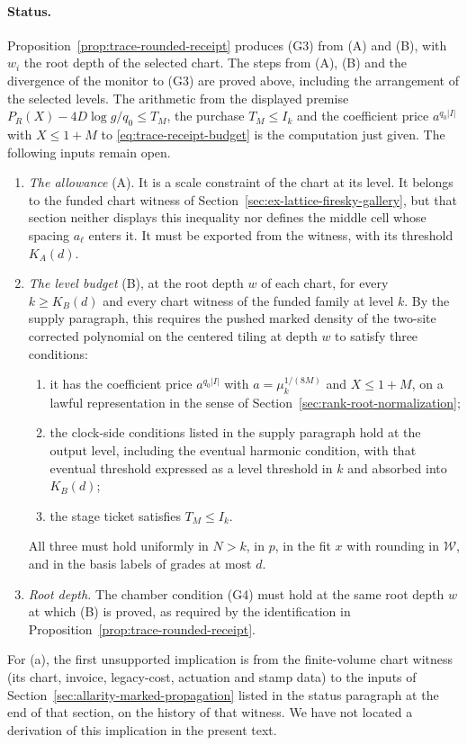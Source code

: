 \paragraph{Status.}
Proposition~\ref{prop:trace-rounded-receipt} produces (G3) from (A) and
(B), with $w_i$ the root depth of the selected chart. The steps from
(A), (B) and the divergence of the monitor to (G3) are proved above,
including the arrangement of the selected levels. The arithmetic from the
displayed premise $P_R(X)-4D\log g/q_0\le T_M$, the purchase
$T_M\le I_k$ and the coefficient price $a^{q_0|I|}$ with $X\le1+M$ to
\eqref{eq:trace-receipt-budget} is the computation just given. The
following inputs remain open.
\begin{enumerate}
\item \emph{The allowance} (A). It is a scale constraint of the chart at
 its level. It belongs to the funded chart witness of
 Section~\ref{sec:ex-lattice-firesky-gallery}, but that section neither
 displays this inequality nor defines the middle cell whose spacing
 $a_\ell$ enters it. It must be exported from the witness, with its
 threshold $K_A(d)$.
\item \emph{The level budget} (B), at the root depth $w$ of each chart,
 for every $k\ge K_B(d)$ and every chart witness of the funded family at
 level $k$. By the supply paragraph, this requires the pushed marked
 density of the two-site corrected polynomial on the centered tiling at
 depth $w$ to satisfy three conditions:
 \begin{enumerate}
 \item[(a)] it has the coefficient price $a^{q_0|I|}$ with
  $a=\mu_k^{1/(8M)}$ and $X\le1+M$, on a lawful representation in the
  sense of Section~\ref{sec:rank-root-normalization};
 \item[(b)] the clock-side conditions listed in the supply paragraph hold
  at the output level, including the eventual harmonic condition, with
  that eventual threshold expressed as a level threshold in $k$ and
  absorbed into $K_B(d)$;
 \item[(c)] the stage ticket satisfies $T_M\le I_k$.
 \end{enumerate}
 All three must hold uniformly in $N>k$, in $p$, in the fit $x$ with
 rounding in $\mathcal W$, and in the basis labels of grades at most $d$.
\item \emph{Root depth.} The chamber condition (G4) must hold at the same
 root depth $w$ at which (B) is proved, as required by the
 identification in Proposition~\ref{prop:trace-rounded-receipt}.
\end{enumerate}
For (a), the first unsupported implication is from the finite-volume
chart witness (its chart, invoice, legacy-cost, actuation and stamp
data) to the inputs of Section~\ref{sec:allarity-marked-propagation}
listed in the status paragraph at the end of that section, on the history
of that witness. We have not located a
derivation of this implication in the present text.
